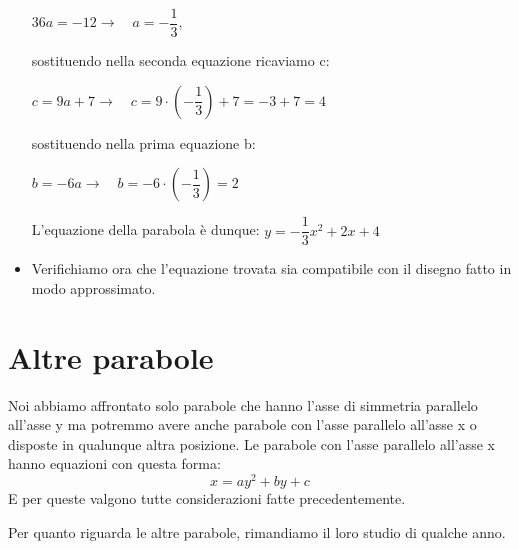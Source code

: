 \begin{esempio}
\begin{itemize}
\(36a=-12 \rightarrow \quad a=-\dfrac{1}{3}\), 

sostituendo nella seconda equazione ricaviamo c:

\(c= 9a+7 \rightarrow \quad c=9 \cdot \left(- \dfrac{1}{3} \right) +7=-3+7=4\)

sostituendo nella prima equazione b:

\(b=-6a \rightarrow \quad b=-6 \cdot \left(- \dfrac{1}{3} \right)=2\)

L'equazione della parabola è dunque: \(y=-\dfrac{1}{3}x^2+2x+4\)

  \item Verifichiamo ora che l'equazione trovata sia compatibile con il disegno 
  fatto in modo approssimato.
 \end{itemize}
\end{esempio}


\section{Altre parabole}
\label{sec:parabola_altreparabole}

Noi abbiamo affrontato solo parabole che hanno l'asse di simmetria parallelo 
all'asse y ma potremmo avere anche parabole con l'asse parallelo all'asse x
o disposte in qualunque altra posizione.
Le parabole con l'asse parallelo all'asse x hanno equazioni con questa forma:
\[x=ay^2+by+c\]
E per queste valgono tutte considerazioni fatte precedentemente.

Per quanto riguarda le altre parabole, rimandiamo il loro studio di qualche 
anno.

